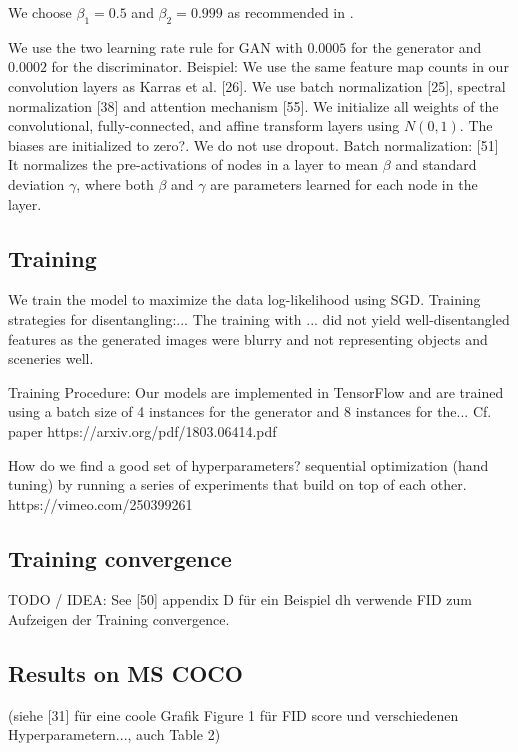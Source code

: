 \documentclass[11pt,a4paper]{article}
\begin{document}
We choose $\beta_1 = 0.5$ and $\beta_2 = 0.999$ as recommended in \cite{1807.04720}.

We use the two learning rate rule for GAN \cite{1706.08500} with $0.0005$ for the generator and $0.0002$ for the discriminator.
Beispiel: We use the same feature map counts in our convolution layers as Karras et al. [26]. We use batch normalization [25], spectral normalization [38] and attention mechanism [55].
We initialize all weights of the convolutional, fully-connected, and affine transform layers using $N(0, 1)$. The biases are initialized to zero?.
We do not use dropout.
Batch normalization: [51] It normalizes the pre-activations of nodes in a layer to mean $\beta$ and standard deviation $\gamma$, where both $\beta$ and $\gamma$ are parameters learned for each node in the layer.

\subsection{Training}
We train the model to maximize the data log-likelihood using SGD.
Training strategies for disentangling:...
The training with ... did not yield well-disentangled features as the generated images were blurry and not representing objects and sceneries well. 

\par Training Procedure: Our models are implemented in TensorFlow \cite{1605.08695} and are trained using a batch size of 4 instances for the generator and 8 instances for the...
Cf. paper https://arxiv.org/pdf/1803.06414.pdf

\par How do we find a good set of hyperparameters? sequential optimization (hand tuning) by running a series of experiments that build on top of each other. https://vimeo.com/250399261

\subsection{Training convergence}
TODO / IDEA: See [50] appendix D für ein Beispiel dh verwende FID zum Aufzeigen der Training convergence.

\subsection{Results on MS COCO}
(siehe [31] für eine coole Grafik Figure 1 für FID score und verschiedenen Hyperparametern..., auch Table 2)
\end{document}
